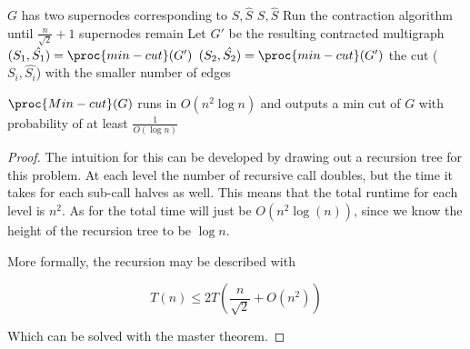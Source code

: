 \documentclass[../notes.tex]{subfiles}
\begin{document}
\begin{codebox}
\li \If $ G $ has two supernodes corresponding to $ S, \hat{S} $ \Then
\li   \Return $ S, \hat{S} $\End 
\li Run the contraction algorithm until $ \frac{n}{\sqrt{2} } + 1 $ supernodes remain
\li Let $ G' $ be the resulting contracted multigraph
\li $ (S_1, \hat{S_1}) = \proc{min-cut}(G') $
\li $ (S_2, \hat{S_2}) = \proc{min-cut}(G') $
\li \Return the cut ($ S_i, \hat{S_i}$) with the smaller number of edges
\end{codebox}

\begin{theorem}
  $ \proc{Min-cut}(G) $ runs in $ O(n^2 \log n) $ and outputs a min cut of $ G $ with probability of at least $ \frac{1}{O(\log n)} $ 


  \begin{proof}
      The intuition for this can be developed by drawing out a recursion tree for this problem.
      At each level the number of recursive call doubles, but the time it takes for each sub-call halves as well.
      This means that the total runtime for each level is $ n^2 $. 
      As for the total time will just be $ O(n^2 \log (n))$, since we know the height of the recursion tree to be $ \log n $.


      More formally, the recursion may be described with 

      \begin{equation}
          T(n) \le  2T(\frac{n}{\sqrt{2} } + O(n^2))
      \end{equation}

      Which can  be solved with the master theorem.
      
  \end{proof}
  


\end{theorem}
\end{document}
